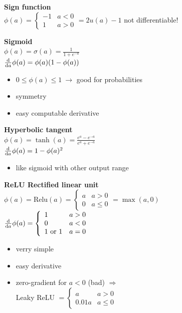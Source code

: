 \documentclass[a4paper,10pt,landscape]{article}
\begin{document}
\begin{multicols*}{3}
    \textbf{Sign function} \\
    $\phi(a) = \left\{\begin{array}{ll} -1 & a<0 \\
                     1 & a>0 \end{array}\right. = 2u(a)-1$
    not differentiable!

    \textbf{Sigmoid} \\
    $\phi(a) = \sigma(a) = \frac{1}{1+e^{-a}} $ \\
    $\dv{a}\phi(a) = \phi(a)(1-\phi(a)) $ \\
    \begin{itemize}
        \item $0\leq \phi(a) \leq 1 \ \rightarrow $ good for probabilities 
        \item symmetry
        \item easy computable derivative
    \end{itemize}

    \textbf{Hyperbolic tangent} \\
    $\phi(a) = \tanh(a) = \frac{e^a-e^{-a}}{e^a+e^{-a}}$ \\
    $\dv{a}\phi(a) = 1 - \phi(a)^2 $ \\
    \begin{itemize}
        \item like sigmoid with other output range
    \end{itemize}

    \textbf{ReLU Rectified linear unit} \\
    $\phi(a) = \textrm{Relu}(a) =  \left\{\begin{array}{ll} a & a>0 \\
						 0 & a\leq 0 \end{array}\right. = \max(a,0) $ \\
   $\dv{a}\phi(a) = \left\{\begin{array}{ll} 1 & a>0 \\
						 0 & a< 0 \\
                        1 \textrm{ or } 1 & a=0 \end{array}\right.$ \\
    \begin{itemize}
        \item verry simple
        \item easy derivative
        \item zero-gradient for $a<0 $ (bad)  $\Rightarrow$  \\
        Leaky ReLU $ = \left\{\begin{array}{ll} a & a> 0 \\
						 0.01a & a\leq 0 \end{array}\right.$ \\
    \end{itemize}


\end{multicols*}
\end{document}
